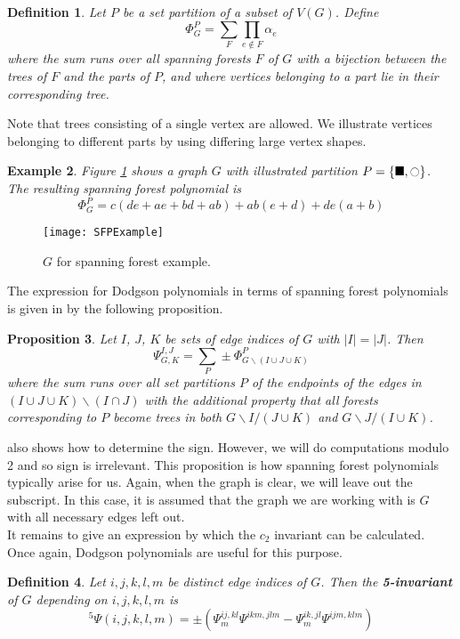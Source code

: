 \documentclass[12pt]{amsart}
\newtheorem{definition}{Definition}
\newtheorem{proposition}[definition]{Proposition}
\newtheorem{example}[definition]{Example}
\numberwithin{definition}{section}
\begin{document}
\begin{definition}
	Let $P$ be a set partition of a subset of $V(G)$. Define
	\[\Phi_G^P=\sum_F\prod_{e\not\in F}\alpha_e\]
	where the sum runs over all spanning forests $F$ of $G$ with a bijection between the trees of $F$ and the parts of $P$, and where vertices belonging to a part lie in their corresponding tree.
\end{definition}
Note that trees consisting of a single vertex are allowed. We illustrate vertices belonging to different parts by using differing large vertex shapes. 
\begin{example}
	Figure \ref{fig sp for G} shows a graph $G$ with illustrated partition $P=\{\blacksquare, \ocircle\}$. The resulting spanning forest polynomial is
	\[\Phi_G^P=c(de + ae + bd + ab)+ab(e+d)+de(a+b)\]
\end{example}
\begin{figure}[h]
\texttt{[image: SFPExample]}
\caption{$G$ for spanning forest example.}\label{fig sp for G}
\end{figure}
The expression for Dodgson polynomials in terms of spanning forest polynomials is given in \cite{BrownYeats2011} by the following proposition. 
\begin{proposition}\label{prop sp for}
	Let $I$, $J$, $K$ be sets of edge indices of $G$ with $|I|=|J|$. Then
	\[\Psi_{G,K}^{I,J}=\sum_P \pm\Phi_{G\backslash (I\cup J\cup K)}^P\]
	where the sum runs over all set partitions $P$ of the endpoints of the edges in $(I\cup J\cup K)\backslash(I\cap J)$ with the additional property that all forests corresponding to $P$ become trees in both $G\backslash I/(J\cup K)$ and $G\backslash J/(I\cup K)$.
\end{proposition}
\cite{BrownYeats2011} also shows how to determine the sign. However, we will do computations modulo 2 and so sign is irrelevant. This proposition is how spanning forest polynomials typically arise for us. Again, when the graph is clear, we will leave out the subscript. In this case, it is assumed that the graph we are working with is $G$ with all necessary edges left out. \\
It remains to give an expression by which the $c_2$ invariant can be calculated. Once again, Dodgson polynomials are useful for this purpose.
\begin{definition}
	Let $i,j,k,l,m$ be distinct edge indices of $G$. Then the \textbf{5-invariant} of $G$ depending on $i,j,k,l,m$ is
	\[^5\Psi(i,j,k,l,m)=\pm(\Psi_m^{ij,kl}\Psi^{ikm,jlm}-\Psi_m^{ik,jl}\Psi^{ijm,klm})\]
\end{definition}
\end{document}
